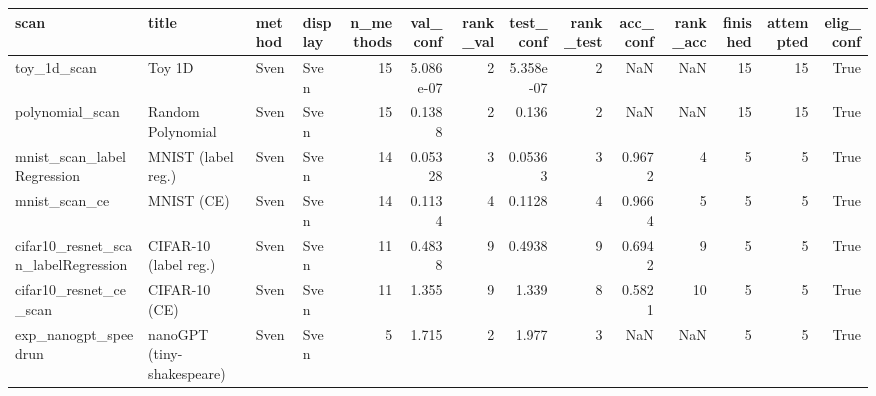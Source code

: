 \begin{tabular}{llllrrrrrrrrrr}
\toprule
scan & title & method & display & n\_methods & val\_conf & rank\_val & test\_conf & rank\_test & acc\_conf & rank\_acc & finished & attempted & elig\_conf \\
\midrule
toy\_1d\_scan & Toy 1D & Sven & Sven & 15 & 5.086e-07 & 2 & 5.358e-07 & 2 & NaN & NaN & 15 & 15 & True \\
polynomial\_scan & Random Polynomial & Sven & Sven & 15 & 0.1388 & 2 & 0.136 & 2 & NaN & NaN & 15 & 15 & True \\
mnist\_scan\_labelRegression & MNIST (label reg.) & Sven & Sven & 14 & 0.05328 & 3 & 0.05363 & 3 & 0.9672 & 4 & 5 & 5 & True \\
mnist\_scan\_ce & MNIST (CE) & Sven & Sven & 14 & 0.1134 & 4 & 0.1128 & 4 & 0.9664 & 5 & 5 & 5 & True \\
cifar10\_resnet\_scan\_labelRegression & CIFAR-10 (label reg.) & Sven & Sven & 11 & 0.4838 & 9 & 0.4938 & 9 & 0.6942 & 9 & 5 & 5 & True \\
cifar10\_resnet\_ce\_scan & CIFAR-10 (CE) & Sven & Sven & 11 & 1.355 & 9 & 1.339 & 8 & 0.5821 & 10 & 5 & 5 & True \\
exp\_nanogpt\_speedrun & nanoGPT (tiny-shakespeare) & Sven & Sven & 5 & 1.715 & 2 & 1.977 & 3 & NaN & NaN & 5 & 5 & True \\
\bottomrule
\end{tabular}
